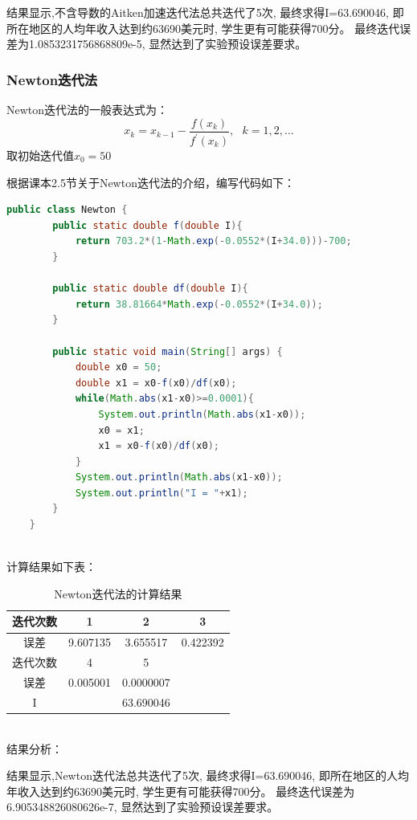 \documentclass[12pt,a4paper]{article}
\begin{document}
结果显示,不含导数的Aitken加速迭代法总共迭代了5次,
最终求得I=63.690046,
即所在地区的人均年收入达到约63690美元时,
学生更有可能获得700分。
最终迭代误差为1.0853231756868809e-5,
显然达到了实验预设误差要求。

\subsubsection{Newton迭代法}
Newton迭代法的一般表达式为：
\begin{equation}
    x_k=x_{k-1}-\frac{f(x_k)}{f^{'}(x_k)},~~~k=1,2,\dots
\end{equation}
取初始迭代值$x_0=50$

根据课本2.5节关于Newton迭代法的介绍，编写代码如下：
\begin{lstlisting}[language={java}]
    public class Newton {
        public static double f(double I){
            return 703.2*(1-Math.exp(-0.0552*(I+34.0)))-700;
        }
    
        public static double df(double I){
            return 38.81664*Math.exp(-0.0552*(I+34.0));
        }
    
        public static void main(String[] args) {
            double x0 = 50;
            double x1 = x0-f(x0)/df(x0);
            while(Math.abs(x1-x0)>=0.0001){
                System.out.println(Math.abs(x1-x0));
                x0 = x1;
                x1 = x0-f(x0)/df(x0);
            }
            System.out.println(Math.abs(x1-x0));
            System.out.println("I = "+x1);
        }
    } 
\end{lstlisting}
~\\
计算结果如下表：
\begin{table}[ht]
    \centering
    \begin{tabular}{|c|c|c|c|} 
     \hline
     迭代次数 & 1 & 2 & 3 \\ [0.5ex] 
     \hline
     误差 & 9.607135 & 3.655517 & 0.422392 \\ 
     \hline
     迭代次数 & 4 & 5 & \\
     \hline
     误差 & 0.005001 & 0.0000007 & \\
     \hline
     I & \multicolumn{3}{c|}{63.690046} \\
     \hline
    \end{tabular}
    \caption{Newton迭代法的计算结果}
    \label{table:7}
\end{table}
~\\
结果分析：

结果显示,Newton迭代法总共迭代了5次,
最终求得I=63.690046,
即所在地区的人均年收入达到约63690美元时,
学生更有可能获得700分。
最终迭代误差为6.905348826080626e-7,
显然达到了实验预设误差要求。
\end{document}
